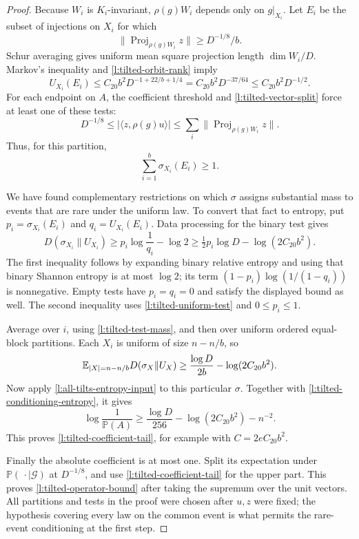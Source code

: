 \begin{proof}
Because $W_i$ is $K_i$-invariant, $\rho(g)W_i$ depends only on
$g|_{X_i}$. Let $E_i$ be the subset of injections on $X_i$ for which
\[
 \|\operatorname{Proj}_{\rho(g)W_i}z\|
       \ge D^{-1/8}/b.
\]
Schur averaging gives uniform mean square projection length
$\dim W_i/D$. Markov's inequality and \eqref{l:tilted-orbit-rank} imply
\begin{equation}
 U_{X_i}(E_i)
 \le C_{20}b^2D^{-1+22/b+1/4}
 =C_{20}b^2D^{-37/64}
 \le C_{20}b^2D^{-1/2}.
 \label{l:tilted-uniform-test}
\end{equation}
For each endpoint on $A$, the coefficient threshold and
\eqref{l:tilted-vector-split} force at least one of these tests:
\[
 D^{-1/8}\le|\langle z,\rho(g)u\rangle|
 \le\sum_i\|\operatorname{Proj}_{\rho(g)W_i}z\|.
\]
Thus, for this partition,
\begin{equation}
 \sum_{i=1}^b\sigma_{X_i}(E_i)\ge1.
 \label{l:tilted-test-mass}
\end{equation}

We have found complementary restrictions on which $\sigma$ assigns
substantial mass to events that are rare under the uniform law. To
convert that fact to entropy, put $p_i=\sigma_{X_i}(E_i)$ and
$q_i=U_{X_i}(E_i)$. Data processing for the binary test gives
\[
 D(\sigma_{X_i}\|U_{X_i})
 \ge p_i\log\frac1{q_i}-\log2
 \ge\tfrac12p_i\log D-\log(2C_{20}b^2).
\]
The first inequality follows by expanding binary relative entropy and
using that binary Shannon entropy is at most $\log2$; its term
$(1-p_i)\log(1/(1-q_i))$ is nonnegative. Empty tests have $p_i=q_i=0$
and satisfy the displayed bound as well. The second inequality uses
\eqref{l:tilted-uniform-test} and $0\le p_i\le1$.

Average over $i$, using \eqref{l:tilted-test-mass}, and then over uniform
ordered equal-block partitions. Each $X_i$ is uniform of size $n-n/b$,
so
\[
 \mathbb E_{|X|=n-n/b}D(\sigma_X\|U_X)
 \ge\frac{\log D}{2b}-\log(2C_{20}b^2).
\]
Now apply \eqref{l:all-tilts-entropy-input} to this particular $\sigma$.
Together with \eqref{l:tilted-conditioning-entropy}, it gives
\[
 \log\frac1{\mathbb P(A)}
 \ge\frac{\log D}{256}-\log(2C_{20}b^2)-n^{-2}.
\]
This proves \eqref{l:tilted-coefficient-tail}, for example with
$C=2eC_{20}b^2$.

Finally the absolute coefficient is at most one. Split its expectation
under $\mathbb P(\,\cdot\mid\mathcal G)$ at $D^{-1/8}$, and use
\eqref{l:tilted-coefficient-tail} for the upper part. This proves
\eqref{l:tilted-operator-bound} after taking the supremum over the unit
vectors. All partitions and tests in the proof were chosen after $u,z$
were fixed; the hypothesis covering every law on the common event is
what permits the rare-event conditioning at the first step.
\end{proof}
